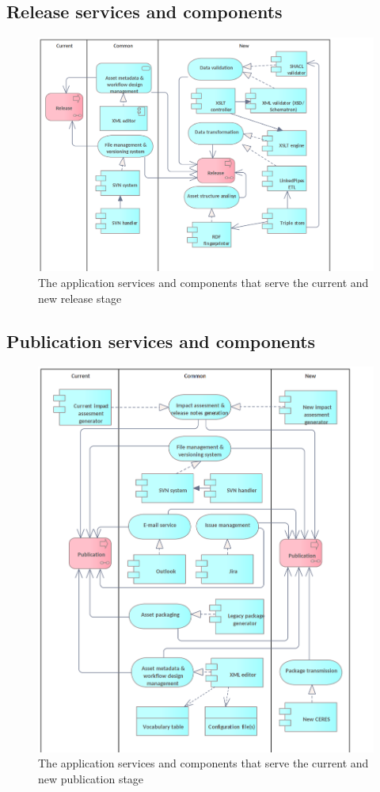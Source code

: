 	\subsection{Release services and components}
	\label{sec:release-application}	
	
	\begin{figure}[h]
		\centering
		\includegraphics[width=.9\textwidth]{images/application/Release v3.png}
		\caption{The application services and components that serve the current and new release stage}
		\label{fig:application-release}
	\end{figure}
	
	\subsection{Publication services and components}
	\label{sec:publication-application}	
	
	\begin{figure}[h]
		\centering
		\includegraphics[width=.9\textwidth]{images/application/Publication v3.png}
		\caption{The application services and components that serve the current and new publication stage}
		\label{fig:application-publication}
	\end{figure}

	